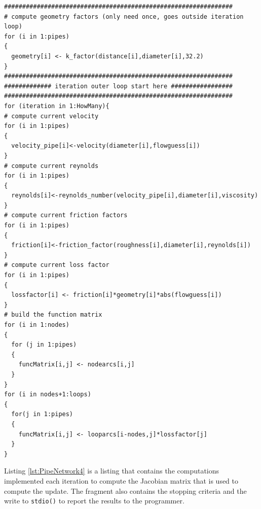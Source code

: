 \begin{lstlisting}[caption=R code demonstrating a Pipeline Network Simulator \\ This fragment of code contains the computations that are used to build the coefficients in the \textbf{Ax=B} system, label=lst:PipeNetwork3]
###############################################################
# compute geometry factors (only need once, goes outside iteration loop)
for (i in 1:pipes)
{
  geometry[i] <- k_factor(distance[i],diameter[i],32.2)
}
###############################################################
############# iteration outer loop start here #################
###############################################################
for (iteration in 1:HowMany){
# compute current velocity
for (i in 1:pipes)
{
  velocity_pipe[i]<-velocity(diameter[i],flowguess[i])
}
# compute current reynolds
for (i in 1:pipes) 
{
  reynolds[i]<-reynolds_number(velocity_pipe[i],diameter[i],viscosity)
}
# compute current friction factors
for (i in 1:pipes) 
{
  friction[i]<-friction_factor(roughness[i],diameter[i],reynolds[i])
}
# compute current loss factor
for (i in 1:pipes)
{
  lossfactor[i] <- friction[i]*geometry[i]*abs(flowguess[i])  
}
# build the function matrix
for (i in 1:nodes)
{
  for (j in 1:pipes)
  {
    funcMatrix[i,j] <- nodearcs[i,j]
  }
}
for (i in nodes+1:loops)
{
  for(j in 1:pipes)
  {
    funcMatrix[i,j] <- looparcs[i-nodes,j]*lossfactor[j]
  }
}
\end{lstlisting}   

Listing \ref{lst:PipeNetwork4} is a listing that contains the computations implemented each iteration to compute the Jacobian matrix that is used to compute the update.  The fragment also contains the stopping criteria and the write to \texttt{stdio()} to report the results to the programmer.

